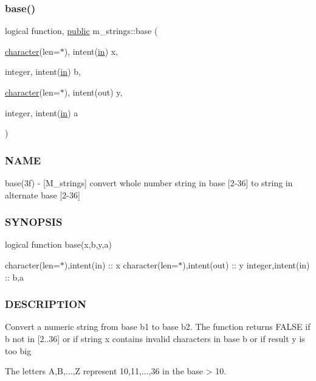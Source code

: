\subsubsection{\texorpdfstring{base()}{base()}}
{\footnotesize\ttfamily logical function, \hyperlink{M__stopwatch_83_8txt_a2f74811300c361e53b430611a7d1769f}{public} m\+\_\+strings\+::base (\begin{DoxyParamCaption}\item[{\hyperlink{option__stopwatch_83_8txt_abd4b21fbbd175834027b5224bfe97e66}{character}(len=$\ast$), intent(\hyperlink{M__journal_83_8txt_afce72651d1eed785a2132bee863b2f38}{in})}]{x,  }\item[{integer, intent(\hyperlink{M__journal_83_8txt_afce72651d1eed785a2132bee863b2f38}{in})}]{b,  }\item[{\hyperlink{option__stopwatch_83_8txt_abd4b21fbbd175834027b5224bfe97e66}{character}(len=$\ast$), intent(out)}]{y,  }\item[{integer, intent(\hyperlink{M__journal_83_8txt_afce72651d1eed785a2132bee863b2f38}{in})}]{a }\end{DoxyParamCaption})}



\subsubsection*{N\+A\+ME}

base(3f) -\/ \mbox{[}M\+\_\+strings\mbox{]} convert whole number string in base \mbox{[}2-\/36\mbox{]} to string in alternate base \mbox{[}2-\/36\mbox{]}

\subsubsection*{S\+Y\+N\+O\+P\+S\+IS}

logical function base(x,b,y,a)

character(len=$\ast$),intent(in) \+:\+: x character(len=$\ast$),intent(out) \+:\+: y integer,intent(in) \+:\+: b,a

\subsubsection*{D\+E\+S\+C\+R\+I\+P\+T\+I\+ON}

\begin{DoxyVerb}Convert a numeric string from base b1 to base b2. The function returns
FALSE if b not in [2..36] or if string x contains invalid
characters in base b or if result y is too big

The letters A,B,...,Z represent 10,11,...,36 in the base > 10.
\end{DoxyVerb}


